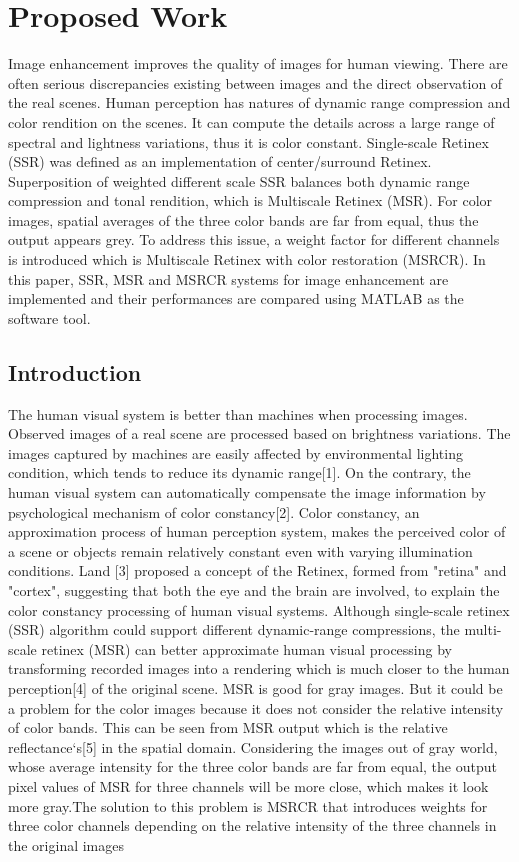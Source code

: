 \chapter{Proposed Work}
Image enhancement improves the quality of images for human viewing. There are often serious discrepancies existing between images and the direct observation of the real scenes. Human perception has natures of dynamic range compression and color rendition on the scenes. It can compute the details across a large range of spectral and lightness variations, thus it is color constant. Single-scale Retinex (SSR) was defined as an implementation of center/surround Retinex. Superposition of weighted different scale SSR balances both dynamic range compression and tonal rendition, which is Multiscale Retinex (MSR). For color images, spatial averages of the three color bands are far from equal, thus the output appears grey. To address this issue, a weight factor for different channels is introduced which is Multiscale Retinex with color restoration (MSRCR). In this paper, SSR, MSR and MSRCR systems for image enhancement are implemented and their performances are compared using MATLAB as the software tool.

\section{Introduction}
The human visual system is better than machines when processing images. Observed images of a real scene are processed based on brightness variations. The images captured by machines are easily affected by environmental lighting condition, which tends to reduce its dynamic range[1]. On the contrary, the human visual system can automatically compensate the image information by psychological mechanism of color constancy[2]. Color constancy, an approximation process of human perception system, makes the perceived color of a scene or objects remain relatively constant even with varying illumination conditions. Land [3] proposed a concept of the Retinex, formed from "retina" and "cortex", suggesting that both the eye and the brain are involved, to explain the color constancy processing of human visual systems. Although single-scale retinex (SSR) algorithm could support different dynamic-range compressions, the multi-scale retinex (MSR) can better approximate human visual processing by transforming recorded images into a rendering which is much closer to the human perception[4] of the original scene. MSR is good for gray images. But it could be a problem for the color images because it does not consider the relative intensity of color bands. This can be seen from MSR output which is the relative reflectance‘s[5] in the spatial domain. Considering the images out of gray world, whose average intensity for the three color bands are far from equal, the output pixel values of MSR for three channels will be more close, which makes it look more gray.The solution to this problem is MSRCR that introduces weights for three color channels depending on the relative intensity of the three channels in the original images


